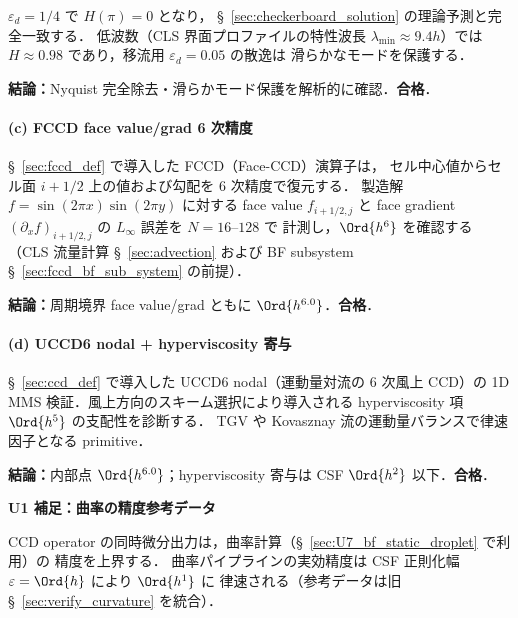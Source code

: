 $\varepsilon_d = 1/4$ で $H(\pi) = 0$ となり，
§~\ref{sec:checkerboard_solution} の理論予測と完全一致する．
低波数（CLS 界面プロファイルの特性波長 $\lambda_{\min} \approx 9.4h$）では
$H \approx 0.98$ であり，移流用 $\varepsilon_d = 0.05$ の散逸は
滑らかなモードを保護する．

\noindent\textbf{結論：}Nyquist 完全除去・滑らかモード保護を解析的に確認．\textbf{合格}．

\paragraph{(c) FCCD face value/grad 6 次精度}
\label{sec:U1_fccd}

§~\ref{sec:fccd_def} で導入した FCCD（Face-CCD）演算子は，
セル中心値からセル面 $i+1/2$ 上の値および勾配を 6 次精度で復元する．
製造解 $f = \sin(2\pi x)\sin(2\pi y)$ に対する face value $f_{i+1/2,j}$ と
face gradient $(\partial_x f)_{i+1/2,j}$ の $L_\infty$ 誤差を $N = 16$--$128$ で
計測し，$\Ord{h^6}$ を確認する（CLS 流量計算 §~\ref{sec:advection} および
BF subsystem §~\ref{sec:fccd_bf_sub_system} の前提）．

\noindent\textbf{結論：}周期境界 face value/grad ともに $\Ord{h^{6.0}}$．\textbf{合格}．

\paragraph{(d) UCCD6 nodal + hyperviscosity 寄与}
\label{sec:U1_uccd6}

§~\ref{sec:ccd_def} で導入した UCCD6 nodal（運動量対流の 6 次風上 CCD）の
1D MMS 検証．風上方向のスキーム選択により導入される
hyperviscosity 項 $\Ord{h^5}$ の支配性を診断する．
TGV や Kovasznay 流の運動量バランスで律速因子となる primitive．

\noindent\textbf{結論：}内部点 $\Ord{h^{6.0}}$；hyperviscosity 寄与は CSF $\Ord{h^2}$ 以下．\textbf{合格}．

\medskip
\noindent\textbf{U1 補足：曲率の精度参考データ}

CCD operator の同時微分出力は，曲率計算（§~\ref{sec:U7_bf_static_droplet} で利用）の
精度を上界する．
曲率パイプラインの実効精度は CSF 正則化幅 $\varepsilon = \Ord{h}$ により $\Ord{h^1}$ に
律速される（参考データは旧 §~\ref{sec:verify_curvature} を統合）．
\label{sec:verify_curvature}%
\label{sec:verify_rc_bracket}%

